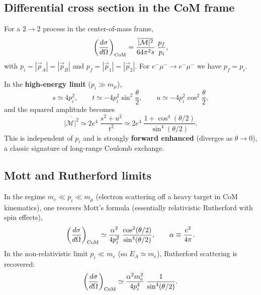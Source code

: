 \subsection{Differential cross section in the CoM frame}
For a $2\to 2$ process in the center-of-mass frame,
\begin{equation}
\left(\frac{d\sigma}{d\Omega}\right)_{\rm CoM}
=
\frac{\overline{|\mathcal{M}|^2}}{64\pi^2 s}\;\frac{p_f}{p_i},
\end{equation}
with $p_i=|\vec p_A|=|\vec p_B|$ and $p_f=|\vec p_1|=|\vec p_2|$.
For $e^-\mu^-\to e^-\mu^-$ we have $p_f=p_i$.

In the \textbf{high-energy limit} ($p_i\gg m_\mu$),
\begin{equation}
s\simeq 4p_i^2,
\qquad
t\simeq -4p_i^2\sin^2\frac{\theta}{2},
\qquad
u\simeq -4p_i^2\cos^2\frac{\theta}{2},
\end{equation}
and the squared amplitude becomes
\begin{equation}
\overline{|\mathcal{M}|^2}
\simeq
2e^4\;\frac{s^2+u^2}{t^2}
\simeq
2e^4\;\frac{1+\cos^4(\theta/2)}{\sin^4(\theta/2)}.
\end{equation}
This is independent of $p_i$ and is strongly \textbf{forward enhanced} (diverges as $\theta\to 0$),
a classic signature of long-range Coulomb exchange.

\subsection{Mott and Rutherford limits}
In the regime $m_e\ll p_i\ll m_\mu$ (electron scattering off a heavy target in CoM kinematics),
one recovers Mott's formula (essentially relativistic Rutherford with spin effects),
\begin{equation}
\left(\frac{d\sigma}{d\Omega}\right)_{\rm CoM}
\simeq
\frac{\alpha^2}{4p_i^2}\;\frac{\cos^2(\theta/2)}{\sin^4(\theta/2)},
\qquad
\alpha\equiv \frac{e^2}{4\pi}.
\end{equation}
In the non-relativistic limit $p_i\ll m_e$ (so $E_A\simeq m_e$), Rutherford scattering is recovered:
\begin{equation}
\left(\frac{d\sigma}{d\Omega}\right)_{\rm CoM}
\simeq
\frac{\alpha^2 m_e^2}{4p_i^4}\;\frac{1}{\sin^4(\theta/2)}.
\end{equation}

